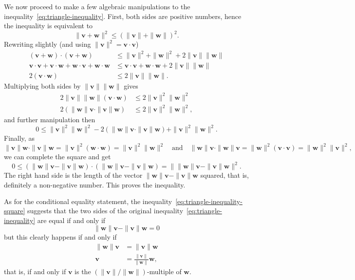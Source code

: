 \begin{thmproof}
 We now proceed to make a few algebraic manipulations to the
 inequality~\eqref{eq:triangle-inequality}. First, both sides are positive
 numbers, hence the inequality is equivalent to
 \[
  \|\mathbf{v} + \mathbf{w}\|^2 \leq (\|\mathbf{v}\| + \|\mathbf{w}\|)^2.
 \]
 Rewriting slightly (and using $\|\mathbf{v}\|^2 = \mathbf{v} \cdot \mathbf{v}$)
 \begin{align*}
  (\mathbf{v} + \mathbf{w}) \cdot (\mathbf{v} + \mathbf{w}) &\leq
  \|\mathbf{v}\|^2 + \|\mathbf{w}\|^2 + 2 \|\mathbf{v}\|\|\mathbf{w}\|\\
  \mathbf{v} \cdot \mathbf{v} + \mathbf{v} \cdot \mathbf{w} + \mathbf{w} \cdot
  \mathbf{v} + \mathbf{w} \cdot \mathbf{w} &\leq \mathbf{v} \cdot \mathbf{v} +
  \mathbf{w} \cdot \mathbf{w} + 2 \|\mathbf{v}\|\|\mathbf{w}\|\\
  2(\mathbf{v} \cdot \mathbf{w}) & \leq 2 \|\mathbf{v}\|\|\mathbf{w}\|.
 \end{align*}
 Multiplying both sides by $\|\mathbf{v}\|\|\mathbf{w}\|$ gives
 \begin{align*}
  2 \|\mathbf{v}\|\|\mathbf{w}\|(\mathbf{v} \cdot \mathbf{w}) &\leq 2
  \|\mathbf{v}\|^2 \|\mathbf{w}\|^2\\
  2(\|\mathbf{w}\|\mathbf{v} \cdot \|\mathbf{v}\|\mathbf{w}) & \leq 2
  \|\mathbf{v}\|^2 \|\mathbf{w}\|^2,
 \end{align*}
 and further manipulation then
 \[
  0 \leq \|\mathbf{v}\|^2 \|\mathbf{w}\|^2 - 2(\|\mathbf{w}\|\mathbf{v} \cdot
  \|\mathbf{v}\|\mathbf{w}) + \|\mathbf{v}\|^2 \|\mathbf{w}\|^2.
 \]
 Finally, as
 \[
  \|\mathbf{v}\|\mathbf{w} \cdot \|\mathbf{v}\|\mathbf{w} =
  \|\mathbf{v}\|^2(\mathbf{w} \cdot \mathbf{w}) =
  \|\mathbf{v}\|^2\|\mathbf{w}\|^2 \quad \text{and} \quad
  \|\mathbf{w}\|\mathbf{v} \cdot \|\mathbf{w}\|\mathbf{v} =
  \|\mathbf{w}\|^2(\mathbf{v} \cdot \mathbf{v}) = \|\mathbf{w}\|^2
  \|\mathbf{v}\|^2,
 \]
 we can complete the square and get
 \begin{equation}
  \label{eq:triangle-inequality-square}
  0 \leq (\|\mathbf{w}\|\mathbf{v} - \|\mathbf{v}\|\mathbf{w}) \cdot
  (\|\mathbf{w}\|\mathbf{v} - \|\mathbf{v}\|\mathbf{w}) = \big\|
  \|\mathbf{w}\|\mathbf{v} - \|\mathbf{v}\|\mathbf{w} \big\|^2.
 \end{equation}
 The right hand side is the length of the vector $\|\mathbf{w}\|\mathbf{v} -
 \|\mathbf{v}\|\mathbf{w}$ squared, that is, definitely a non-negative number.
 This proves the inequality.

 As for the conditional equality statement, the
 inequality~\eqref{eq:triangle-inequality-square} suggests that the two sides of
 the original inequality~\eqref{eq:triangle-inequality} are equal if and only if
 \[
  \|\mathbf{w}\|\mathbf{v} - \|\mathbf{v}\|\mathbf{w} = 0
 \]
 but this clearly happens if and only if
 \begin{align*}
  \|\mathbf{w}\|\mathbf{v} &= \|\mathbf{v}\|\mathbf{w}\\
  \mathbf{v} &= \frac{\|\mathbf{v}\|}{\|\mathbf{w}\|}\mathbf{w},
 \end{align*}
 that is, if and only if $\mathbf{v}$ is the $(\|\mathbf{v}\| /
 \|\mathbf{w}\|)$-multiple of $\mathbf{w}$.


\end{thmproof}
